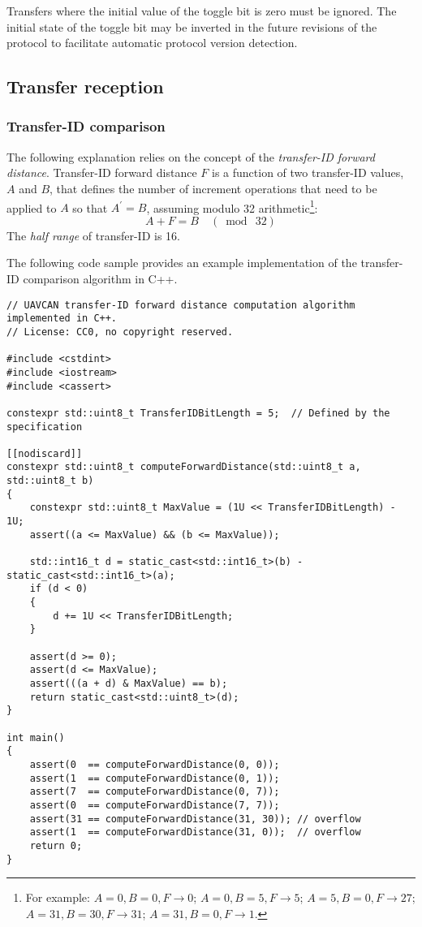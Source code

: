 Transfers where the initial value of the toggle bit is zero must be ignored.
The initial state of the toggle bit may be inverted in the future revisions of the protocol
to facilitate automatic protocol version detection.

\subsection{Transfer reception}\label{sec:transfer_reception}

\subsubsection{Transfer-ID comparison}\label{sec:transfer_id_forward_distance}

The following explanation relies on the concept of the \emph{transfer-ID forward distance}.
Transfer-ID forward distance $F$ is a function of two transfer-ID values,
$A$ and $B$, that defines the number of increment operations that need to be applied to
$A$ so that $A^\prime{} = B$, assuming modulo 32 arithmetic\footnote{%
    For example:
    $A=0, B=0, F\rightarrow0$;
    $A=0, B=5, F\rightarrow5$;
    $A=5, B=0, F\rightarrow27$;
    $A=31, B=30, F\rightarrow31$;
    $A=31, B=0, F\rightarrow1$.
}:
$$A + F = B \quad (\bmod{}\ 32)$$
The \emph{half range} of transfer-ID is 16.

The following code sample provides an example implementation of the transfer-ID comparison algorithm in C++.

\begin{minipage}{0.9\textwidth}  %
\begin{verbatim}
// UAVCAN transfer-ID forward distance computation algorithm implemented in C++.
// License: CC0, no copyright reserved.

#include <cstdint>
#include <iostream>
#include <cassert>

constexpr std::uint8_t TransferIDBitLength = 5;  // Defined by the specification

[[nodiscard]]
constexpr std::uint8_t computeForwardDistance(std::uint8_t a, std::uint8_t b)
{
    constexpr std::uint8_t MaxValue = (1U << TransferIDBitLength) - 1U;
    assert((a <= MaxValue) && (b <= MaxValue));

    std::int16_t d = static_cast<std::int16_t>(b) - static_cast<std::int16_t>(a);
    if (d < 0)
    {
        d += 1U << TransferIDBitLength;
    }

    assert(d >= 0);
    assert(d <= MaxValue);
    assert(((a + d) & MaxValue) == b);
    return static_cast<std::uint8_t>(d);
}

int main()
{
    assert(0  == computeForwardDistance(0, 0));
    assert(1  == computeForwardDistance(0, 1));
    assert(7  == computeForwardDistance(0, 7));
    assert(0  == computeForwardDistance(7, 7));
    assert(31 == computeForwardDistance(31, 30)); // overflow
    assert(1  == computeForwardDistance(31, 0));  // overflow
    return 0;
}
\end{verbatim}
\end{minipage}

